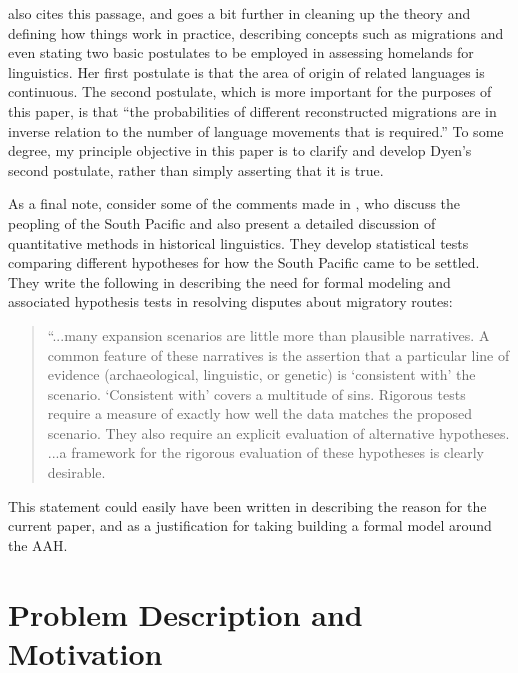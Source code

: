\documentclass[11pt]{article}
\begin{document}
\citet[p. 623]{dyen56} also cites this passage, and goes a bit further in cleaning up the theory and defining how things work in practice, describing concepts such as migrations and even stating two basic postulates to be employed in assessing homelands for linguistics. Her first postulate is that the area of origin of related languages is continuous. The second postulate, which is more important for the purposes of this paper, is that ``the probabilities of different reconstructed migrations are in inverse relation to the number of language movements that is required.'' \citep[p.613]{dyen56} 
To some degree, my principle objective in this paper is to clarify and develop Dyen's second postulate, rather than simply asserting that it is true.

As a final note, consider some of the comments made in \cite{greenhill05}, who discuss the peopling of the South Pacific and also present a detailed discussion of quantitative methods in historical linguistics. They develop statistical tests comparing different hypotheses for how the South Pacific came to be settled. They write the following in describing the need for formal modeling and associated hypothesis tests in resolving disputes about migratory routes:

\begin{quote}
``...many expansion scenarios are little more than plausible narratives. A common feature of these narratives is the assertion that a particular line of evidence (archaeological, linguistic, or genetic) is `consistent with' the scenario. `Consistent with' covers a multitude of sins. Rigorous tests require a measure of exactly how well the data matches the proposed scenario. They also require an explicit evaluation of alternative hypotheses. ...a framework for the rigorous evaluation of these hypotheses is clearly desirable. \citep[p. 31]{greenhill05} 
\end{quote}
This statement could easily have been written in describing the reason for the current paper, and as a justification for taking building a formal model around the AAH.

 


\section{Problem Description and Motivation}
\end{document}

